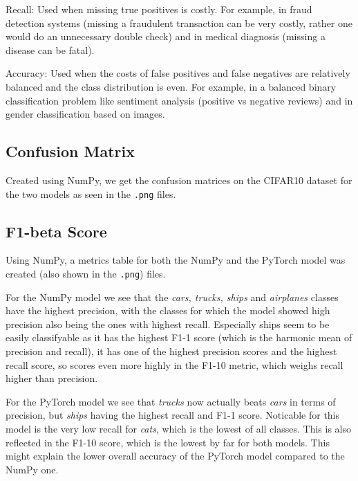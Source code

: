 \documentclass[a4paper]{article}
\begin{document}
Recall: Used when missing true positives is costly. For example, in fraud detection systems (missing a fraudulent
transaction can be very costly, rather one would do an unnecessary double check) and in medical diagnosis (missing
a disease can be fatal).

Accuracy: Used when the costs of false positives and false negatives are relatively balanced and the class
distribution is even. For example, in a balanced binary classification problem like sentiment analysis
(positive vs negative reviews) and in gender classification based on images.
\bigskip

\subsection{Confusion Matrix}
Created using NumPy, we get the confusion matrices on the CIFAR10 dataset for the two models as seen in the
\texttt{.png} files.

\bigskip

\subsection{F1-beta Score}
Using NumPy, a metrics table for both the NumPy and the PyTorch model was created (also shown in the \texttt{.png})
files.

For the NumPy model we see that the \textit{cars, trucks, ships} and \textit{airplanes} classes have the highest
precision, with the classes for which the model showed high precision also being the ones with highest recall.
Especially ships seem to be easily classifyable as it has the highest F1-1 score (which is the harmonic mean of
precision and recall), it has one of the highest precision scores and the highest recall score, so scores even more
highly in the F1-10 metric, which weighs recall higher than precision.

For the PyTorch model we see that \textit{trucks} now actually beats \textit{cars} in terms of precision, but
\textit{ships} having the highest recall and F1-1 score. Noticable for this model is the very low recall for
\textit{cats}, which is the lowest of all classes. This is also reflected in the F1-10 score, which is the lowest
by far for both models. This might explain the lower overall accuracy of the PyTorch model compared to the NumPy one.
\end{document}
